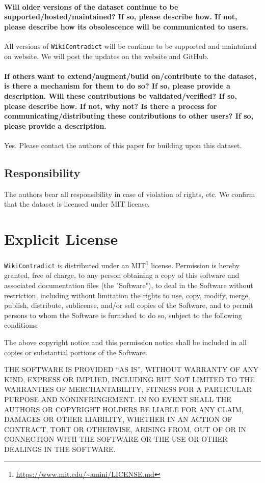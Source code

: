 \documentclass{article}
\begin{document}
\paragraph{Will older versions of the dataset continue to be supported/hosted/maintained? If so, please
describe how. If not, please describe how its obsolescence will be communicated to users.}
All versions of \texttt{WikiContradict} will be continue to be supported and maintained on website. We will post the updates on the website and GitHub.

\paragraph{If others want to extend/augment/build on/contribute to the dataset, is there a mechanism for
them to do so? If so, please provide a description. Will these contributions be validated/verified?
If so, please describe how. If not, why not? Is there a process for communicating/distributing
these contributions to other users? If so, please provide a description.}
Yes. Please contact the authors of this paper for building upon this dataset.

\subsection{Responsibility}
The authors bear all responsibility in case of violation of rights, etc. We confirm that the dataset is licensed under MIT license.



\section{Explicit License}


\texttt{WikiContradict} is distributed under an MIT\footnote{\url{https://www.mit.edu/~amini/LICENSE.md}} license.
Permission is hereby granted, free of charge, to any person obtaining a copy of this software and associated documentation files (the "Software"), to deal in the Software without restriction, including without limitation the rights to use, copy, modify, merge, publish, distribute, sublicense, and/or sell copies of the Software, and to permit persons to whom the Software is furnished to do so, subject to the following conditions:

The above copyright notice and this permission notice shall be included in all copies or substantial portions of the Software.

THE SOFTWARE IS PROVIDED ``AS IS'', WITHOUT WARRANTY OF ANY KIND, EXPRESS OR IMPLIED, INCLUDING BUT NOT LIMITED TO THE WARRANTIES OF MERCHANTABILITY, FITNESS FOR A PARTICULAR PURPOSE AND NONINFRINGEMENT. IN NO EVENT SHALL THE AUTHORS OR COPYRIGHT HOLDERS BE LIABLE FOR ANY CLAIM, DAMAGES OR OTHER LIABILITY, WHETHER IN AN ACTION OF CONTRACT, TORT OR OTHERWISE, ARISING FROM, OUT OF OR IN CONNECTION WITH THE SOFTWARE OR THE USE OR OTHER DEALINGS IN THE SOFTWARE. 
\end{document}
